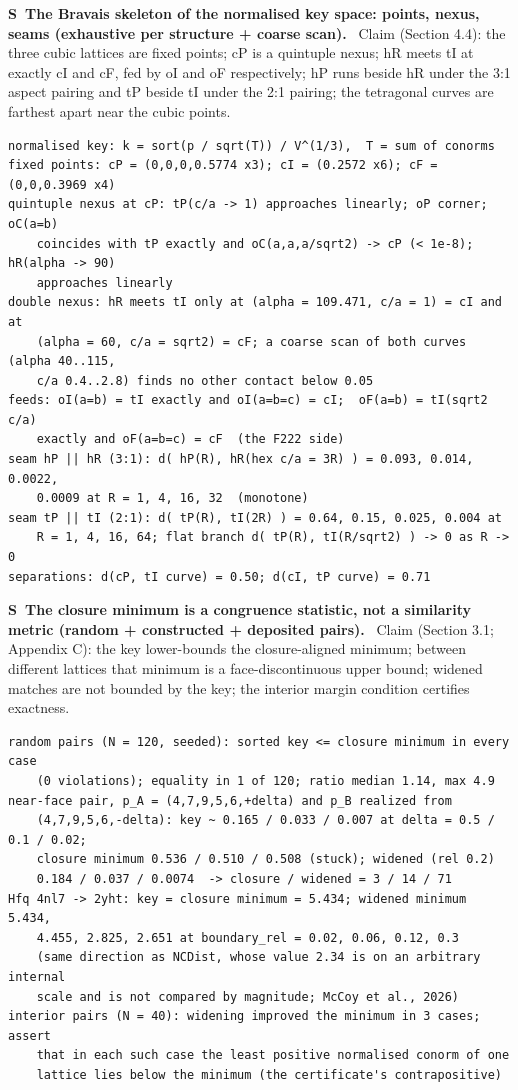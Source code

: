 \documentclass[11pt]{article}
\newcounter{scheck}
\renewcommand{\thescheck}{S\arabic{scheck}}
\newcommand{\sitem}[2]{\medskip\noindent\refstepcounter{scheck}\label{#1}\textbf{\thescheck\ #2.}\ }
\begin{document}
\sitem{z:skeleton}{The Bravais skeleton of the normalised key space: points, nexus, seams (exhaustive per structure + coarse scan)}
Claim (Section 4.4): the three cubic lattices are fixed points; cP is a quintuple nexus; hR meets tI at exactly cI and cF, fed by oI and oF respectively; hP runs beside hR under the 3:1 aspect pairing and tP beside tI under the 2:1 pairing; the tetragonal curves are farthest apart near the cubic points.
\begin{footnotesize}\begin{verbatim}
normalised key: k = sort(p / sqrt(T)) / V^(1/3),  T = sum of conorms
fixed points: cP = (0,0,0,0.5774 x3); cI = (0.2572 x6); cF = (0,0,0.3969 x4)
quintuple nexus at cP: tP(c/a -> 1) approaches linearly; oP corner; oC(a=b)
    coincides with tP exactly and oC(a,a,a/sqrt2) -> cP (< 1e-8); hR(alpha -> 90)
    approaches linearly
double nexus: hR meets tI only at (alpha = 109.471, c/a = 1) = cI and at
    (alpha = 60, c/a = sqrt2) = cF; a coarse scan of both curves (alpha 40..115,
    c/a 0.4..2.8) finds no other contact below 0.05
feeds: oI(a=b) = tI exactly and oI(a=b=c) = cI;  oF(a=b) = tI(sqrt2 c/a)
    exactly and oF(a=b=c) = cF  (the F222 side)
seam hP || hR (3:1): d( hP(R), hR(hex c/a = 3R) ) = 0.093, 0.014, 0.0022,
    0.0009 at R = 1, 4, 16, 32  (monotone)
seam tP || tI (2:1): d( tP(R), tI(2R) ) = 0.64, 0.15, 0.025, 0.004 at
    R = 1, 4, 16, 64; flat branch d( tP(R), tI(R/sqrt2) ) -> 0 as R -> 0
separations: d(cP, tI curve) = 0.50; d(cI, tP curve) = 0.71
\end{verbatim}\end{footnotesize}

\sitem{z:closure-metric}{The closure minimum is a congruence statistic, not a similarity metric (random + constructed + deposited pairs)}
Claim (Section 3.1; Appendix C): the key lower-bounds the closure-aligned minimum; between different lattices that minimum is a face-discontinuous upper bound; widened matches are not bounded by the key; the interior margin condition certifies exactness.
\begin{footnotesize}\begin{verbatim}
random pairs (N = 120, seeded): sorted key <= closure minimum in every case
    (0 violations); equality in 1 of 120; ratio median 1.14, max 4.9
near-face pair, p_A = (4,7,9,5,6,+delta) and p_B realized from
    (4,7,9,5,6,-delta): key ~ 0.165 / 0.033 / 0.007 at delta = 0.5 / 0.1 / 0.02;
    closure minimum 0.536 / 0.510 / 0.508 (stuck); widened (rel 0.2)
    0.184 / 0.037 / 0.0074  -> closure / widened = 3 / 14 / 71
Hfq 4nl7 -> 2yht: key = closure minimum = 5.434; widened minimum 5.434,
    4.455, 2.825, 2.651 at boundary_rel = 0.02, 0.06, 0.12, 0.3
    (same direction as NCDist, whose value 2.34 is on an arbitrary internal
    scale and is not compared by magnitude; McCoy et al., 2026)
interior pairs (N = 40): widening improved the minimum in 3 cases; assert
    that in each such case the least positive normalised conorm of one
    lattice lies below the minimum (the certificate's contrapositive)
\end{verbatim}\end{footnotesize}
\end{document}
